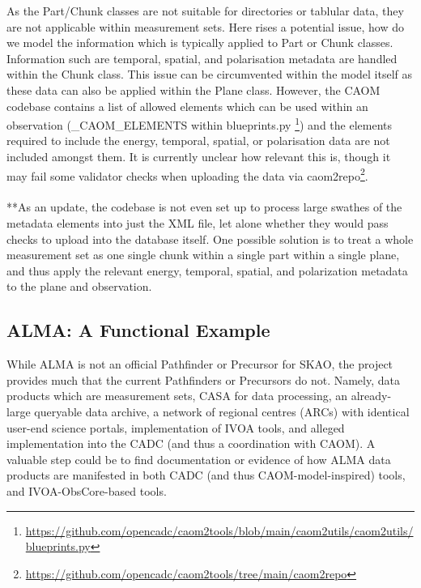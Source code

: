 As the Part/Chunk classes are not suitable for directories or tablular data, they are not applicable within measurement sets.
Here rises a potential issue, how do we model the information which is typically applied to Part or Chunk classes.
Information such are temporal, spatial, and polarisation metadata are handled within the Chunk class.
This issue can be circumvented within the model itself as these data can also be applied within the Plane class. 
However, the CAOM codebase contains a list of allowed elements which can be used within an observation (\_CAOM\_ELEMENTS within blueprints.py \footnote{\url{https://github.com/opencadc/caom2tools/blob/main/caom2utils/caom2utils/blueprints.py}}) and the elements required to include the energy, temporal, spatial, or polarisation data are not included amongst them.
It is currently unclear how relevant this is, though it may fail some validator checks when uploading the data via caom2repo\footnote{\url{https://github.com/opencadc/caom2tools/tree/main/caom2repo}}. \\
\\**As an update, the codebase is not even set up to process large swathes of the metadata elements into just the XML file, let alone whether they would pass checks to upload into the database itself. One possible solution is to treat a whole measurement set as one single chunk within a single part within a single plane, and thus apply the relevant energy, temporal, spatial, and polarization metadata to the plane and observation.    


\subsection{ALMA: A Functional Example}
While ALMA is not an official Pathfinder or Precursor for SKAO, the project provides much that the current Pathfinders or Precursors do not. 
Namely, data products which are measurement sets, CASA for data processing, an already-large queryable data archive, a network of regional centres (ARCs) with identical user-end science portals, implementation of IVOA tools, and alleged implementation into the CADC (and thus a coordination with CAOM).  A valuable step could be to find documentation or evidence of how ALMA data products are manifested in both CADC (and thus CAOM-model-inspired) tools, and IVOA-ObsCore-based tools. \\
